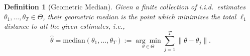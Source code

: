\documentclass[11pt]{article}
\newtheorem{definition}{Definition}
\begin{document}


\begin{definition}[Geometric Median]
	\label{def:median}
	Given a finite collection of i.i.d.\ estimates $\theta_1,\ldots,\theta_T  \in \Theta$, their geometric median is the point which minimizes the total $\ell_1$ distance to all the given estimates, \emph{i.e.},
	\begin{equation}
	\label{eqn:median}
	\widehat{\theta} = \mathrm{median}(\theta_1,\ldots,\theta_T) := \underset{\theta \in \Theta}{\arg\min}\sum_{j=1}^T\|\theta -\theta_j\|.
	\end{equation}
\end{definition}
\end{document}
